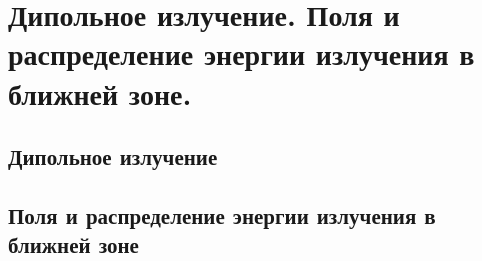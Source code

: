 \chapter{Дипольное излучение. Поля и распределение энергии излучения в 
ближней зоне.}

\section{Дипольное излучение}
\section{Поля и распределение энергии излучения в ближней зоне}

